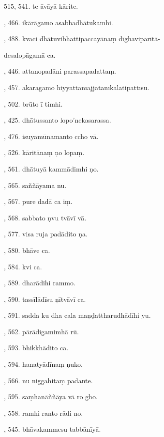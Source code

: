 515, 541. te āvāyā kārite.\hfill \pageref{sut:515}\par {}, 466. ikārāgamo asabbadhātukamhi.\hfill \pageref{sut:516}\par {}, 488. kvaci dhātuvibhattipaccayānaṃ dīghaviparītā-\par \noindent
\hspace{15mm} desalopāgamā ca.\hfill \pageref{sut:517}\par {}, 446. attanopadāni parassapadattaṃ.\hfill \pageref{sut:518}\par {}, 457. akārāgamo hiyyattanīajjatanīkālātipattīsu.\hfill \pageref{sut:519}\par {}, 502. brūto ī timhi.\hfill \pageref{sut:520}\par {}, 425. dhātussanto lopo’nekasarassa.\hfill \pageref{sut:521}\par {}, 476. isuyamūnamanto ccho vā.\hfill \pageref{sut:522}\par {}, 526. kāritānaṃ ṇo lopaṃ.\hfill \pageref{sut:523}\par {}, 561. dhātuyā kammādimhi ṇo.\par {}, 565. saññāyama nu.\par {}, 567. pure dadā ca iṃ.\par {}, 568. sabbato ṇvu tvāvī vā.\par {}, 577. visa ruja padādito ṇa.\par {}, 580. bhāve ca.\par {}, 584. kvi ca.\par {}, 589. dharādīhi rammo.\par {}, 590. tassīlādīsu ṇītvāvī ca.\par {}, 591. sadda ku dha cala maṇḍattharudhādīhi yu.\par {}, 562. pārādigamimhā rū.\par {}, 593. bhikkhādito ca.\par {}, 594. hanatyādīnaṃ ṇuko.\par {}, 566. nu niggahitaṃ padante.\par {}, 595. saṃhanāññāya vā ro gho.\par {}, 558. ramhi ranto rādi no.\par {}, 545. bhāvakammesu tabbānīyā.\par \noindent

